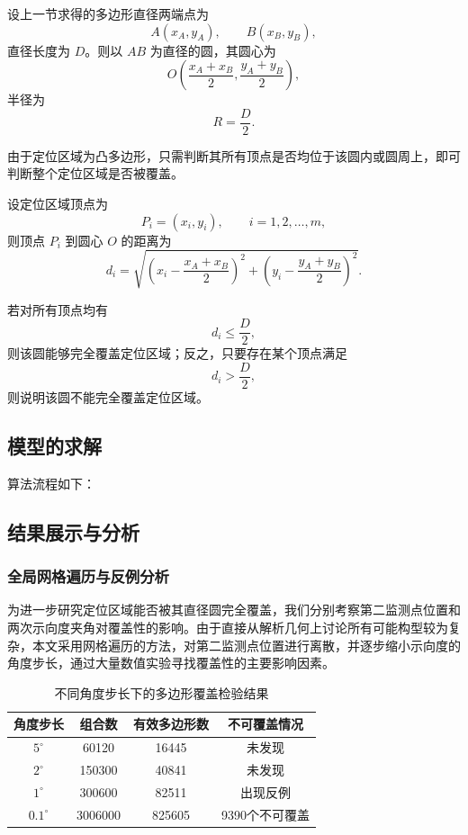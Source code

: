 \documentclass[withoutpreface,bwprint]{cumcmthesis}
\begin{document}
设上一节求得的多边形直径两端点为
\[
A(x_A,y_A),\qquad B(x_B,y_B),
\]
直径长度为 $D$。则以 $AB$ 为直径的圆，其圆心为
\[
O\left(\frac{x_A+x_B}{2},\frac{y_A+y_B}{2}\right),
\]
半径为
\[
R=\frac{D}{2}.
\]

由于定位区域为凸多边形，只需判断其所有顶点是否均位于该圆内或圆周上，即可判断整个定位区域是否被覆盖。

设定位区域顶点为
\[
P_i=(x_i,y_i),\qquad i=1,2,\ldots,m,
\]
则顶点 $P_i$ 到圆心 $O$ 的距离为
\[
d_i=
\sqrt{
\left(x_i-\frac{x_A+x_B}{2}\right)^2+
\left(y_i-\frac{y_A+y_B}{2}\right)^2
}.
\]

若对所有顶点均有
\[
d_i\leq \frac{D}{2},
\]
则该圆能够完全覆盖定位区域；反之，只要存在某个顶点满足
\[
d_i>\frac{D}{2},
\]
则说明该圆不能完全覆盖定位区域。

\subsection{模型的求解}算法流程如下：


\subsection{结果展示与分析}
\subsubsection{全局网格遍历与反例分析}
为进一步研究定位区域能否被其直径圆完全覆盖，我们分别考察第二监测点位置和两次示向度夹角对覆盖性的影响。由于直接从解析几何上讨论所有可能构型较为复杂，本文采用网格遍历的方法，对第二监测点位置进行离散，并逐步缩小示向度的角度步长，通过大量数值实验寻找覆盖性的主要影响因素。
\begin{table}[htbp]
    \centering
    \caption{不同角度步长下的多边形覆盖检验结果}
    \label{tab:polygon-cover-results}
    \begin{tabular}{cccc}
        \hline
        角度步长 & 组合数 & 有效多边形数 & 不可覆盖情况 \\
        \hline
        $5^\circ$   & 60120   & 16445  & 未发现 \\
        $2^\circ$   & 150300  & 40841  & 未发现 \\
        $1^\circ$   & 300600  & 82511  & 出现反例 \\
        $0.1^\circ$ & 3006000 & 825605 & 9390个不可覆盖 \\
        \hline
    \end{tabular}
\end{table}
\end{document}
